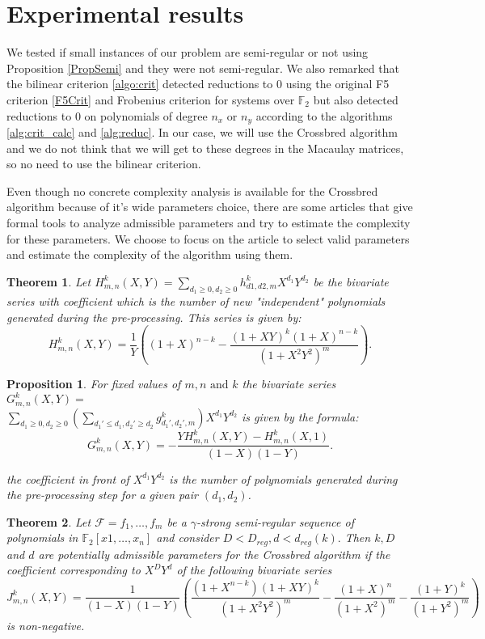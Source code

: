 \documentclass[english]{article}
\newtheorem{proposition}{Proposition}[section]
\newtheorem{theorem}{Theorem}[section]
\begin{document}
	\section{Experimental results}
		We tested if small instances of our problem are semi-regular or not using Proposition \ref{PropSemi} and they were not semi-regular. We also remarked that the bilinear criterion \ref{algo:crit} detected reductions to 0 using the original F5 criterion \ref{F5Crit} and Frobenius criterion for systems over $\mathbb{F}_2$ but also detected reductions to 0 on polynomials of degree $n_x$ or $n_y$ according to the algorithms \ref{alg:crit_calc} and \ref{alg:reduc}. In our case, we will use the Crossbred algorithm and we do not think that we will get to these degrees in the Macaulay matrices, so no need to use the bilinear criterion.
		
		Even though no concrete complexity analysis is available for the Crossbred algorithm because of it's wide parameters choice, there are some articles that give formal tools to analyze admissible parameters and try to estimate the complexity for these parameters. We choose to focus on the article \cite{VID24} to select valid parameters and estimate the complexity of the algorithm using them.
		
		\begin{theorem}
			Let $H_{m, n}^k(X,Y) = \sum_{d_1 \geq 0, d_2 \geq 0} h_{d1, d2, m}^k X^{d_1}Y^{d_2}$ be the bivariate series with coefficient which is the number of new "independent" polynomials generated during the pre-processing. This series is given by:
			$$
				H_{m, n}^k(X, Y) = \frac{1}{Y}\left((1+X)^{n-k} - \frac{(1+XY)^k(1+X)^{n-k}}{(1+X^2Y^2)^m}\right).
			$$
		\end{theorem}
		
		\begin{proposition}
			For fixed values of $m, n \text{ and } k$ the bivariate series $G^{k}_{m,n}(X, Y) = $ \\ $\sum_{d_1 \geq 0, d_2 \geq 0}(\sum_{d_{1}' \leq d_1, d_{2}' \geq d_2} g_{d_{1}',d_{2}',m}^k)X^{d_1}Y^{d_2}$ is given by the formula:
			$$
				G^{k}_{m,n}(X, Y) = - \frac{YH_{m, n}^k(X,Y) - H_{m, n}^k(X, 1)}{(1-X)(1-Y)}.
			$$
			
			the coefficient in front of $X^{d_1}Y^{d_2}$ is the number of polynomials generated during the pre-processing step for a given pair $(d_1, d_2)$.
		\end{proposition}
		
		\begin{theorem}
			Let $\mathcal{F} = {f_1,\dots,f_m}$ be a $\gamma$-strong semi-regular sequence of polynomials in $\mathbb{F}_2[x1,\dots,x_n]$ and consider $D < D_{reg}, d < d_{reg}(k).$ Then $k, D$ and $d$ are potentially admissible parameters for the Crossbred algorithm if the coefficient corresponding to $X^DY^d$ of the following bivariate series
			$$
			J_{m, n}^k(X, Y) = \frac{1}{(1-X)(1-Y)}\left(\frac{(1+X^{n-k})(1+XY)^k}{(1+X^2Y^2)^m} - \frac{(1+X)^n}{(1+X^2)^m} - \frac{(1+Y)^k}{(1+Y^2)^m}\right)
			$$
			is non-negative.
		\end{theorem}
		
\end{document}
